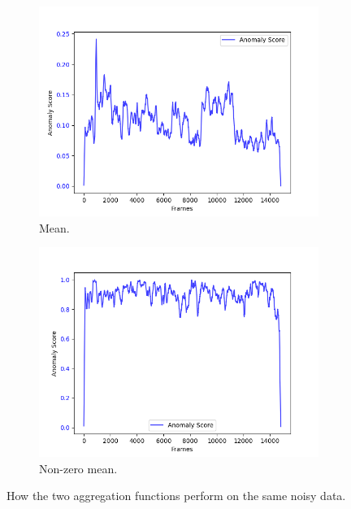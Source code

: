 \begin{figure}[H]
    \centering
    \begin{subfigure}[t]{0.5\textwidth}
        \centering
        \includegraphics[width=\textwidth]{resources/methodology/aggr_noisy_mean.png}
        \caption{Mean.}
    \end{subfigure}%
    \begin{subfigure}[t]{0.5\textwidth}
        \centering
        \includegraphics[width=\textwidth]{resources/methodology/aggr_noisy_nzmean.png}
        \caption{Non-zero mean.}
    \end{subfigure}
    \caption{How the two aggregation functions perform on the same noisy data.}
    \label{fig:aggr_noisy}
\end{figure}
